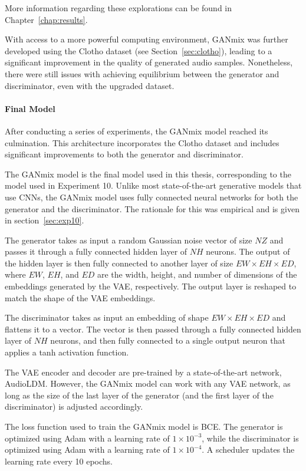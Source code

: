 More information regarding these explorations can be found in Chapter~\ref{chap:results}.

With access to a more powerful computing environment, GANmix was further developed using the Clotho dataset (see Section~\ref{sec:clotho}), leading to a significant improvement in the quality of generated audio samples. Nonetheless, there were still issues with achieving equilibrium between the generator and discriminator, even with the upgraded dataset.

\paragraph{Final Model}

After conducting a series of experiments, the GANmix model reached its culmination. This architecture incorporates the Clotho dataset and includes significant improvements to both the generator and discriminator.

The GANmix model is the final model used in this thesis, corresponding to the model used in Experiment 10. Unlike most state-of-the-art generative models that use \acp{CNN}, the GANmix model uses fully connected neural networks for both the generator and the discriminator. The rationale for this was empirical and is given in section~\ref{sec:exp10}.

The generator takes as input a random Gaussian noise vector of size $NZ$ and passes it through a fully connected hidden layer of $NH$ neurons. The output of the hidden layer is then fully connected to another layer of size $EW \times EH \times ED$, where $EW$, $EH$, and $ED$ are the width, height, and number of dimensions of the embeddings generated by the \ac{VAE}, respectively. The output layer is reshaped to match the shape of the \ac{VAE} embeddings.

The discriminator takes as input an embedding of shape $EW \times EH \times ED$ and flattens it to a vector. The vector is then passed through a fully connected hidden layer of $NH$ neurons, and then fully connected to a single output neuron that applies a tanh activation function.

The \ac{VAE} encoder and decoder are pre-trained by a state-of-the-art network, AudioLDM. However, the GANmix model can work with any \ac{VAE} network, as long as the size of the last layer of the generator (and the first layer of the discriminator) is adjusted accordingly.

The loss function used to train the GANmix model is \ac{BCE}. The generator is optimized using Adam with a learning rate of $1 \times 10^{-3}$, while the discriminator is optimized using Adam with a learning rate of $1 \times 10^{-4}$. A scheduler updates the learning rate every 10 epochs.

